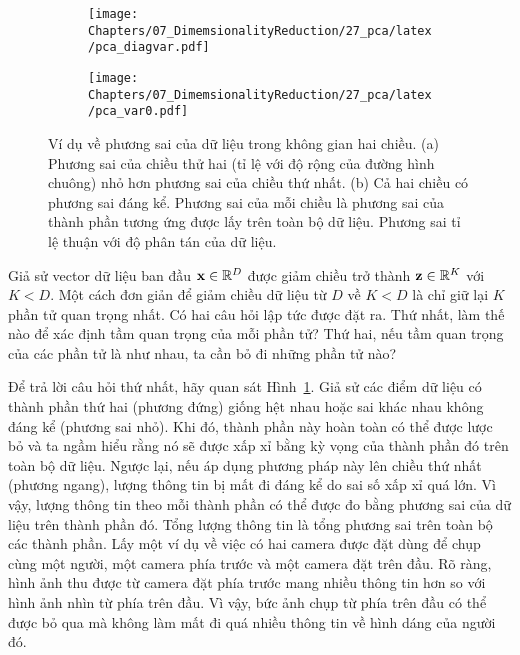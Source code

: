\begin{figure}[t]
\begin{subfigure}{0.59\textwidth}
\texttt{[image: Chapters/07\_DimemsionalityReduction/27\_pca/latex/pca\_diagvar.pdf]}
\caption{}
\label{fig:pca_2a}
\end{subfigure}
\begin{subfigure}{0.33\textwidth}
\texttt{[image: Chapters/07\_DimemsionalityReduction/27\_pca/latex/pca\_var0.pdf]}
\caption{}
\label{fig:pca_2b}
\end{subfigure}
\caption{Ví dụ về phương sai của dữ liệu trong không gian hai chiều. (a)
Phương sai của chiều thử hai (tỉ lệ với độ rộng của đường hình chuông) nhỏ
hơn phương sai của chiều thứ nhất. (b) Cả hai chiều có phương sai đáng kể. Phương sai của
mỗi chiều là phương sai của thành phần tương ứng được lấy trên toàn bộ dữ
liệu. Phương sai tỉ lệ thuận với độ phân tán của dữ liệu.}
\label{fig:pca_2}
\end{figure}

Giả sử vector dữ liệu ban đầu $\mathbf{x} \in \mathbb{R}^{D}$ được giảm chiều trở thành $\mathbf{z}
\in \mathbb{R}^K$ với $K < D$. Một cách đơn giản để giảm chiều dữ liệu từ $D$ về $K < D$ là chỉ giữ lại $K$ phần tử {quan trọng nhất}. Có hai câu hỏi lập tức
được đặt ra. Thứ nhất, làm thế nào để xác định {tầm quan trọng} của
mỗi phần tử? Thứ hai, nếu tầm quan trọng của các phần tử là như
nhau, ta cần bỏ đi những phần tử nào?

Để trả lời câu hỏi thứ nhất, hãy quan sát Hình~\ref{fig:pca_2a}. Giả sử các
điểm dữ liệu có thành phần thứ hai (phương đứng) giống hệt nhau hoặc sai khác
nhau không đáng kể (phương sai nhỏ). Khi đó, thành phần này hoàn toàn có thể được lược
bỏ và ta ngầm hiểu rằng nó sẽ được xấp xỉ bằng kỳ vọng của thành phần đó
trên toàn bộ dữ liệu. Ngược lại, nếu áp dụng phương pháp này lên chiều thứ nhất (phương ngang), {lượng thông tin} bị mất đi đáng kể do sai số xấp xỉ quá lớn. Vì vậy, lượng thông tin theo mỗi thành phần có thể được đo bằng phương sai của dữ liệu trên thành phần đó. Tổng lượng
thông tin là tổng phương sai trên toàn bộ các thành phần. Lấy
một ví dụ về việc có hai camera được đặt dùng để chụp cùng một người, một camera
phía trước và một camera đặt trên đầu. Rõ ràng, hình ảnh thu được từ
camera đặt phía trước mang nhiều thông tin hơn so với hình ảnh nhìn từ
phía trên đầu. Vì vậy, bức ảnh chụp từ phía trên đầu có thể được bỏ qua mà không
làm mất đi quá nhiều thông tin về hình dáng của người đó.

